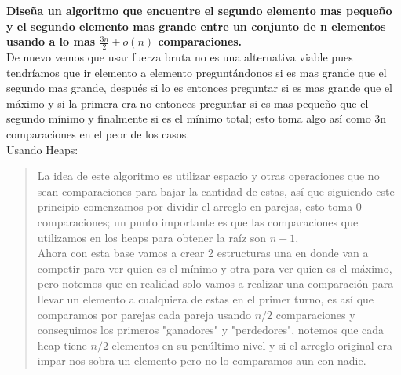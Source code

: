 \textbf{Diseña un algoritmo que encuentre el segundo elemento mas pequeño y el segundo elemento mas grande entre un conjunto de n elementos usando a lo mas $\frac{3n}{2} + o(n)$ comparaciones.}\\

De nuevo vemos que usar fuerza bruta no es una alternativa viable pues tendríamos que ir elemento a elemento preguntándonos si es mas grande que el segundo mas grande, después si lo es entonces preguntar si es mas grande que el máximo y si la primera era no entonces preguntar si es mas pequeño que el segundo mínimo y finalmente si es el mínimo total; esto toma algo así como 3n comparaciones en el peor de los casos.\\

\textcolor{bibi}{Usando Heaps:}
\begin{quote}
    La idea de este algoritmo es utilizar espacio y otras operaciones que no sean comparaciones para bajar la cantidad de estas, así que siguiendo este principio comenzamos por dividir el arreglo en parejas, esto toma 0 comparaciones; un punto importante es que las comparaciones que utilizamos en los heaps para obtener la raíz son $n-1$,\\

    Ahora con esta base vamos a crear 2 estructuras una en donde van a competir para ver quien es el mínimo y otra para ver quien es el máximo, pero notemos que en realidad solo vamos a realizar una comparación para llevar un elemento a cualquiera de estas en el primer turno, es así que comparamos por parejas cada pareja usando $n/2$ comparaciones y conseguimos los primeros "ganadores" y "perdedores", notemos que cada heap tiene $n/2$ elementos en su penúltimo nivel y si el arreglo original era impar nos sobra un elemento pero no lo comparamos aun con nadie.\\


\end{quote}
